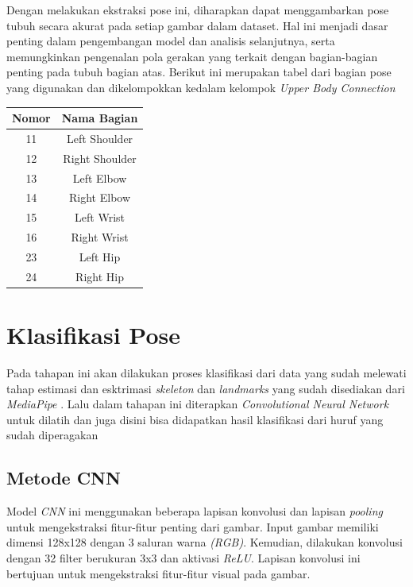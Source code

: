 Dengan melakukan ekstraksi pose ini, diharapkan dapat menggambarkan pose tubuh secara akurat pada setiap gambar dalam dataset. Hal ini menjadi dasar penting dalam pengembangan model dan analisis selanjutnya, serta memungkinkan pengenalan pola gerakan yang terkait dengan bagian-bagian penting pada tubuh bagian atas. Berikut ini merupakan tabel dari bagian pose yang digunakan dan dikelompokkan kedalam kelompok \textit{Upper Body Connection}

\begin{center}
	\begin{table}[hbt!]
		\label{tbl:PoseLandmarks}
		\centering
		\begin{tabular}{cc}
			\hline
			Nomor & Nama Bagian \\
			\hline
			
			11 & Left Shoulder \\
			\hline
			
			12 & Right Shoulder \\
			\hline
			
			13 & Left Elbow \\
			\hline
			
			14 & Right Elbow \\
			\hline
			
			15 & Left Wrist \\
			\hline
			
			16 & Right Wrist \\
			\hline
			
			23 & Left Hip \\
			\hline
			
			24 & Right Hip \\
			\hline
		\end{tabular}
	\end{table}
	\end{center}

\section{Klasifikasi Pose}
Pada tahapan ini akan dilakukan proses klasifikasi dari data yang sudah melewati tahap estimasi dan esktrimasi \textit{skeleton} dan \textit{landmarks} yang sudah disediakan dari \textit{\textit{MediaPipe}} . Lalu dalam tahapan ini  diterapkan \textit{Convolutional Neural Network} untuk dilatih dan juga disini bisa didapatkan hasil klasifikasi dari huruf yang sudah diperagakan


\subsection{Metode CNN}
Model \textit{CNN} ini  menggunakan beberapa lapisan konvolusi dan lapisan \textit{pooling} untuk mengekstraksi fitur-fitur penting dari gambar. Input gambar memiliki dimensi 128x128 dengan 3 saluran warna \textit{(RGB)}. Kemudian, dilakukan konvolusi dengan 32 filter berukuran 3x3 dan aktivasi \textit{ReLU}. Lapisan konvolusi ini bertujuan untuk mengekstraksi fitur-fitur visual pada gambar.

